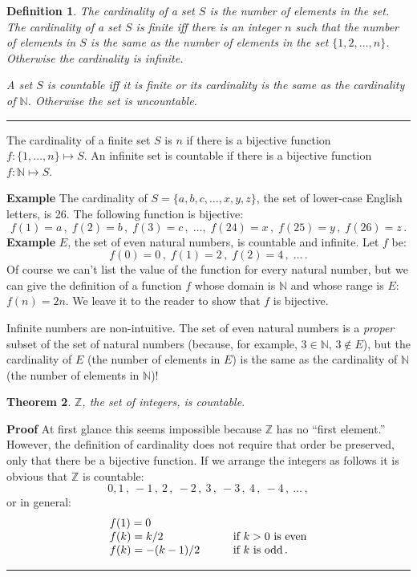 \documentclass[12pt,a4paper]{article}
\newtheorem{theorem}{Theorem}
\newtheorem{definition}[theorem]{Definition}
\newcommand*{\qed}{\hfill\rule[-2pt]{4pt}{10pt}}
\newenvironment{example}{\textbf{Example}}{}
\newenvironment{proof}{\textbf{Proof}}{\qed}
\begin{document}
\begin{definition}
The \emph{cardinality} of a set $S$ is the number of elements in the set. The cardinality of a set $S$ is \emph{finite} iff there is an integer $n$ such that the number of elements in $S$ is the same as the number of elements in the set \(\{1,2,\ldots,n\}\). Otherwise the cardinality is \emph{infinite}.

A set $S$ is \emph{countable} iff it is finite or its cardinality is the same as the cardinality of $\mathbb{N}$. Otherwise the set is \emph{uncountable}.\qed
\end{definition}

The cardinality of a finite set $S$ is $n$ if there is a bijective function $f: \{1,\ldots,n\}\mapsto S$. An infinite set is countable if there is a bijective function $f:\mathbb{N}\mapsto S$.

\begin{example}
The cardinality of $S=\{a,b,c,\ldots,x,y,z\}$, the set of lower-case English letters, is 26. The following function is bijective:
\[
f(1) = a\,,\;f(2) = b\,,\;f(3) = c\,,\;\ldots,\; f(24) = x\,,\;f(25) = y\,,\;f(26) = z\,.
\]
\end{example}
\begin{example}
$E$, the set of even natural numbers, is countable and infinite. Let $f$ be:
\[
f(0) = 0\,,\;f(1) = 2\,,\;f(2) = 4\,,\;\ldots\,.
\]
Of course we can't list the value of the function for every natural number, but we can give the definition of a function $f$ whose domain is $\mathbb{N}$ and whose range is $E$: $f(n)=2n$. We leave it to the reader to show that $f$ is bijective.
\end{example}

Infinite numbers are non-intuitive. The set of even natural numbers is a \emph{proper} subset of the set of natural numbers (because, for example, $3\in \mathbb{N},\, 3\not\in E$), but the cardinality of $E$ (the number of elements in $E$) is the same as the cardinality of $\mathbb{N}$ (the number of elements in $\mathbb{N}$)!

\begin{theorem}
$\mathbb{Z}$, the set of integers, is countable.
\end{theorem}

\begin{proof}
At first glance this seems impossible because $\mathbb{Z}$ has no ``first element.'' However, the definition of cardinality does not require that order be preserved, only that there be a bijective function. If we arrange the integers as follows it is obvious that $\mathbb{Z}$ is countable:
\[
0,1\,,\:-1\,,\:2\,,\:-2\,,\:3\,,\:-3\,,\:4\,,\:-4\,,\:\ldots\,,
\]
or in general:
\[
\begin{array}{l@{\hspace{3em}}l}
f(1)=0\\
f(k)=k / 2 & \textrm{if\ } k>0 \textrm{\ is even}\\
f(k)=- (k-1)/2 & \textrm{if\ } k \textrm{\ is odd}\,.
\end{array}
\vspace{-3ex}
\]
\end{proof}
\end{document}
